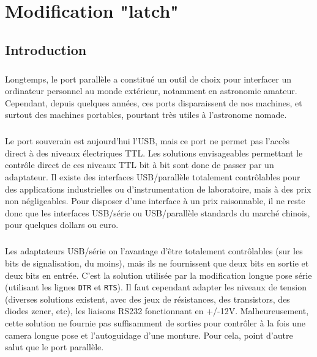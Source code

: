 \documentclass[11pt,a4paper]{book}
\begin{document}
\chapter{Modification "latch"}

\section{Introduction}

\paragraph*{}
Longtemps, le port parall\`ele a constitu\'e un outil de choix pour
interfacer un ordinateur personnel au monde ext\'erieur, notamment en
astronomie amateur. Cependant, depuis quelques ann\'ees, ces ports
disparaissent de nos machines, et surtout des machines portables,
pourtant tr\`es utiles \`a l'astronome nomade.

\paragraph*{}
Le port souverain est aujourd'hui l'USB, mais ce port ne permet pas l'acc\`es
 direct \`a des niveaux \'electriques TTL. Les solutions envisageables
permettant le contr\^ole direct de ces niveaux TTL bit \`a bit sont donc de
passer par un adaptateur. Il existe des interfaces USB/parall\`ele totalement
contr\^olables pour des applications industrielles ou d'instrumentation de 
laboratoire, mais \`a des prix non n\'egligeables. Pour disposer d'une 
interface \`a un prix raisonnable, il ne reste donc que les interfaces USB/s\'erie 
ou USB/parall\`ele standards du march\'e chinois, pour quelques dollars ou euro.

\paragraph*{}
Les adaptateurs USB/s\'erie on l'avantage d'\^etre totalement contr\^olables (sur les bits
de signalisation, du moins), mais ils ne fournissent que deux bits en sortie et deux bits en
entr\'ee. C'est la solution utilis\'ee par la modification longue pose s\'erie (utilisant
les lignes {\tt DTR} et {\tt RTS}). Il faut cependant adapter les niveaux de tension 
(diverses solutions existent, avec des jeux de r\'esistances, des transistors, des diodes
 zener, etc), les liaisons RS232
 fonctionnant en +/-12V. Malheureusement, cette solution ne fournie pas suffisamment de 
 sorties pour contr\^oler \`a la fois une camera longue pose et l'autoguidage d'une
 monture. Pour cela, point d'autre salut que le port parall\`ele.
\end{document}
